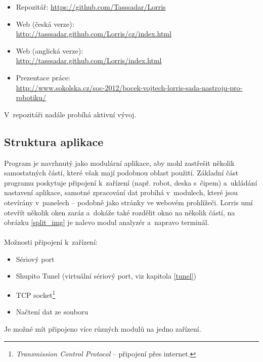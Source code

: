 \documentclass[12pt, a4paper, oneside]{article}
\newcommand{\It}{\textit}  %
\begin{document}
\begin{itemize}
    \item Repozitář: \url{https://github.com/Tasssadar/Lorris}
    \item Web (česká verze):\\ \url{http://tasssadar.github.com/Lorris/cz/index.html}
    \item Web (anglická verze):\\ \url{http://tasssadar.github.com/Lorris/index.html}
    \item Prezentace práce: \\ \url{http://www.sokolska.cz/soc-2012/bocek-vojtech-lorris-sada-nastroju-pro-robotiku/}
\end{itemize}
V~repozitáři nadále probíhá aktivní vývoj.


\subsection{Struktura aplikace}
Program je navrhnutý jako modulární aplikace, aby mohl zastřešit několik samostatných částí, které však mají podobnou oblast použití. Základní část programu poskytuje připojení k~zařízení (např. robot, deska s~čipem) a~ukládání nastavení aplikace, samotné zpracování dat probíhá v~modulech, které jsou otevírány v~panelech -- podobně jako stránky ve webovém prohlížeči. Lorris umí otevřít několik oken zaráz a~dokáže také rozdělit okno na několik částí, na obrázku \ref{split_img} je nalevo modul analyzér a~napravo terminál. \\
\\
\noindent Možnosti připojení k~zařízení:
\begin{itemize}
    \item Sériový port
    \item Shupito Tunel (virtuální sériový port, viz kapitola \ref{tunel})
    \item TCP socket\footnote{\It{Transmission Control Protocol} -- připojení přes internet.}
    \item Načtení dat ze souboru
\end{itemize}
Je možné mít připojeno více různých modulů na jedno zařízení.  
\end{document}
